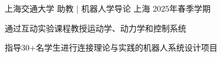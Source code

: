 
\vspace{-7mm}

\begin{cventries}
    \cventry
    {上海交通大学} %
    {助教 | 机器人学导论} %
    {上海} %
    {2025年春季学期} %
    {
        \vspace{-5mm}
        \begin{cvitems}
            \item{通过互动实验课程教授运动学、动力学和控制系统}
            \item{指导30+名学生进行连接理论与实践的机器人系统设计项目}
        \end{cvitems}
        \vspace{5mm}
    }
\end{cventries}